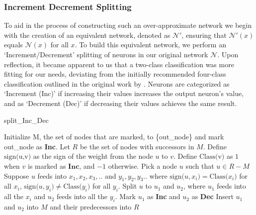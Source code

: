 \subsubsection{Increment Decrement Splitting}
To aid in the process of constructing such an over-approximate network we begin with the creation of an equivalent network, denoted as $\mathcal{N}'$, ensuring that $\mathcal{N'}(x)$ equals $\mathcal{N}(x)$ for all $x$. To build this equivalent network, we perform an `Increment/Decrement' splitting of neurons in our original network $\mathcal{N}$. Upon reflection, it became apparent to us that a two-class classification was more fitting for our needs, deviating from the initially recommended four-class classification outlined in the original work by \cite{b2}.
Neurons are categorized as `Increment (Inc)' if increasing their values increases the output neuron's value, and as `Decrement (Dec)' if decreasing their values achieves the same result.

\begin{algorithm}[H]
    \caption{split\_Inc\_Dec}
    \begin{algorithmic}[1]
        \State Initialize M, the set of nodes that are marked, to \{out\_node\} and mark out\_node as \textbf{Inc}.
        \State Let $R$ be the set of nodes with successors in $M$.
        \State Define $\text{sign(u,v)}$ as the sign of the weight from the node $u$ to $v$.
        \State Define $\text{Class(v)}$ as $1$ when $v$ is marked as $\textbf{Inc}$, and $-1$ otherwise.
        \State Pick a node $u$ such that $u \in R-M$
        \State Suppose $u$ feeds into $x_1,x_2,x_3,..$ and $y_1,y_2,y_3..$ where $\text{sign($u,x_i$)} = \text{Class($x_i$)}$ for all $x_i$, $\text{sign($u,y_i$)} \neq \text{Class($y_i$)}$ for all $y_i$.
        \State Split $u$ to $u_1$ and $u_2$, where $u_1$ feeds into all the $x_i$ and $u_2$ feeds into all the $y_i$.
        \State Mark $u_1$ as \textbf{Inc} and $u_2$ as \textbf{Dec}
        \State Insert $u_1$ and $u_2$ into $M$ and their predecessors into $R$
        \EndWhile
        \end{algorithmic}
\end{algorithm}


